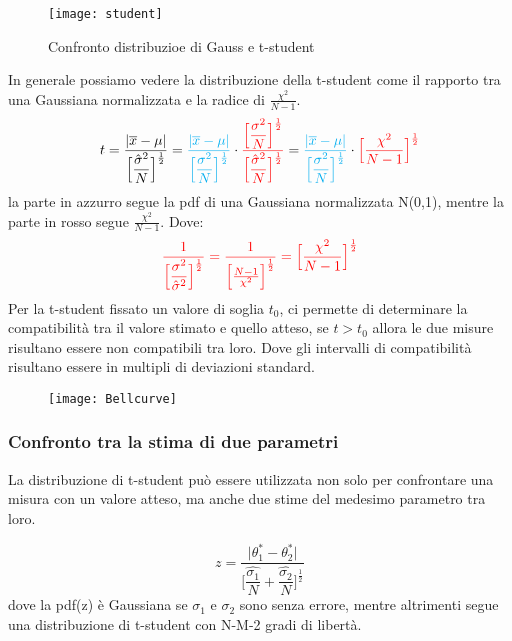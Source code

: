 \documentclass[11pt,a4paper]{book}
\begin{document}
  
\begin{figure}[ht]
\vspace{0.1in}
\texttt{[image: student]}	
\centering
\vspace{0.1in}
\caption{Confronto distribuzioe di Gauss e t-student}
\end{figure}
In generale possiamo vedere la distribuzione della t-student come il rapporto tra una Gaussiana normalizzata e la radice di  $\frac{\chi^2}{N-1}$.
\begin{equation*}
	t = \dfrac{\vert \overline{x} - \mu \vert}{\Big [{\dfrac{\hat{\sigma}^2}{N}} \Big ]^{\frac{1}{2}}} = \textcolor{cyan}{\dfrac{\vert \overline{x} - \mu \vert}{\Big [{\dfrac{\sigma^2}{N}} \Big ]^{\frac{1}{2}}}} \cdot \textcolor{red}{\dfrac{\Big [ \dfrac{\sigma^2}{N} \Big]^{\frac{1}{2}}}{\Big [ \dfrac{\hat{\sigma}^2}{N} \Big]^{\frac{1}{2}}}} = \textcolor{cyan}{\dfrac{\vert \overline{x} - \mu \vert}{\Big [{\dfrac{\sigma^2}{N}} \Big ]^{\frac{1}{2}}}} \cdot \textcolor{red}{\Big [ \dfrac{\chi^2}{N-1} \Big ]^{\frac{1}{2}}}  
\end{equation*}
la parte in azzurro segue la pdf di una Gaussiana normalizzata N(0,1), mentre la parte in rosso segue $\frac{\chi^2}{N-1}$. Dove:
\begin{equation*}
	\textcolor{red}{\dfrac{1}{\Big [ \dfrac{\sigma^2}{\hat{\sigma}^2} \Big ]^{\frac{1}{2}}} = \dfrac{1}{\Big[  \frac{N-1}{\chi^2} \Big ]^{\frac{1}{2}} } = \Big [ \dfrac{\chi^2}{N-1} \Big ]^{\frac{1}{2}}  } 
\end{equation*}
Per la t-student fissato un valore di soglia $t_0$, ci permette di determinare la compatibilit\`{a} tra il valore stimato e quello atteso, se $t>t_0$ allora le due misure risultano essere non compatibili tra loro. Dove gli intervalli di compatibilit\`{a} risultano essere in multipli di deviazioni standard.
\begin{figure}[ht]
\vspace{0.1in}
\texttt{[image: Bellcurve]}	
\centering
\end{figure}

\subsubsection{Confronto tra la stima di due parametri}

La distribuzione di t-student pu\`{o} essere utilizzata non solo per confrontare una misura con un valore atteso, ma anche due stime del medesimo parametro tra loro.

\begin{equation}
	z = \dfrac{\vert \theta^*_1 - \theta^*_2 \vert }{ \Big [\dfrac{\hat{\sigma_1}}{N} +\dfrac{\hat{\sigma_2}}{N} \Big ]^{\frac{1}{2}}}
\end{equation}
dove la pdf(z) \`{e} Gaussiana se $\sigma_1$ e $\sigma_2$ sono senza errore, mentre altrimenti segue una distribuzione di t-student con N-M-2 gradi di libert\`{a}.
\end{document}
